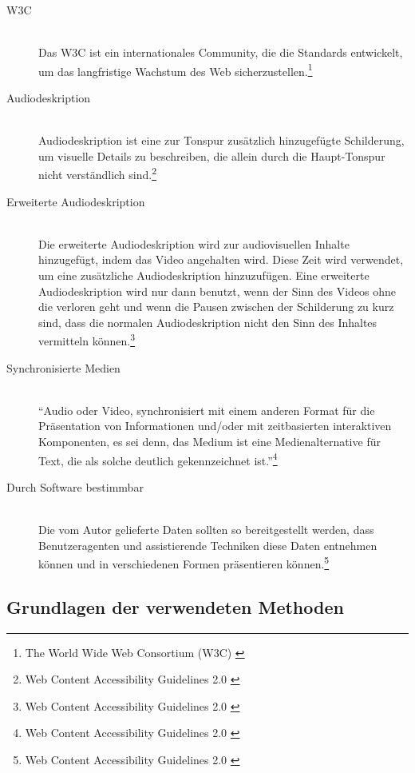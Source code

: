 \begin{description}
	\item[\ac{W3C}]\hfill \\
	Das \ac{W3C} ist ein internationales Community, die die Standards entwickelt, um das langfristige Wachstum des Web 
	sicherzustellen.\footnote{The World Wide Web Consortium (W3C) \cite{w3c}}
	
	\item[Audiodeskription]\hfill \\
	Audiodeskription ist eine zur Tonspur zusätzlich hinzugefügte Schilderung, um visuelle Details zu beschreiben, die allein durch die Haupt-Tonspur 
	nicht verständlich sind.\footnote{Web Content Accessibility Guidelines 2.0 \cite{WCAG2.0}}
	
	\item[Erweiterte Audiodeskription]\hfill \\
	Die erweiterte Audiodeskription wird zur audiovisuellen Inhalte hinzugefügt, indem das Video angehalten wird. Diese Zeit wird verwendet, 
	um eine zusätzliche Audiodeskription hinzuzufügen. Eine erweiterte Audiodeskription wird nur dann benutzt, wenn der Sinn des Videos ohne die verloren geht und wenn 
	die Pausen zwischen der Schilderung zu kurz sind, dass die normalen Audiodeskription nicht den Sinn des Inhaltes vermitteln 
	können.\footnote{Web Content Accessibility Guidelines 2.0 \cite{WCAG2.0}}
	
	\item[Synchronisierte Medien]\hfill \\
	"`Audio oder Video, synchronisiert mit einem anderen Format für die Präsentation von Informationen und/oder mit zeitbasierten interaktiven 
	Komponenten, es sei denn, das Medium ist eine Medienalternative für Text, die als solche deutlich gekennzeichnet 
	ist."'\footnote{Web Content Accessibility Guidelines 2.0 \cite{WCAG2.0}}
	
	\item[Durch Software bestimmbar]\hfill \\
	Die vom Autor gelieferte Daten sollten so bereitgestellt werden, dass Benutzeragenten und assistierende Techniken diese Daten entnehmen können und in verschiedenen
	Formen präsentieren können.\footnote{Web Content Accessibility Guidelines 2.0 \cite{WCAG2.0}}
	
\end{description}

\subsection{Grundlagen der verwendeten Methoden}

